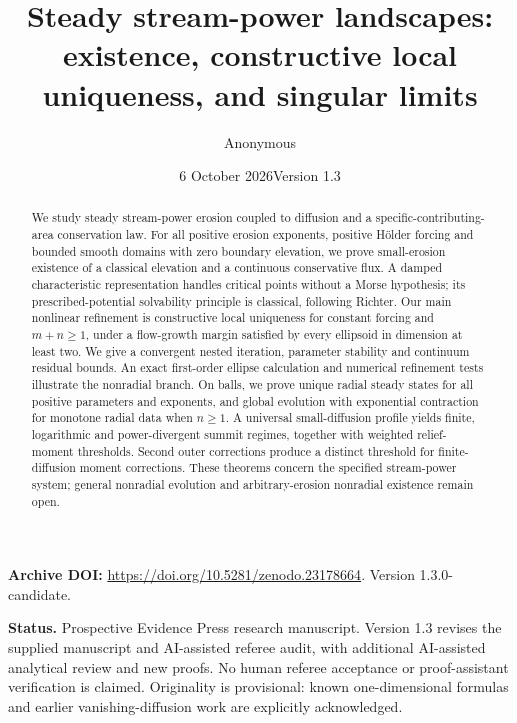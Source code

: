 \documentclass[11pt,a4paper]{article}
\title{Steady stream-power landscapes:\\existence, constructive local uniqueness, and singular limits}
\author{Anonymous}
\date{6 October 2026\quad\textnormal{Version 1.3}}
\theoremstyle{definition}\newtheorem{definition}[theorem]{Definition}
\theoremstyle{remark}\newtheorem{remark}[theorem]{Remark}
\begin{document}
\maketitle
\noindent\textbf{Archive DOI:} \url{https://doi.org/10.5281/zenodo.23178664}. Version 1.3.0-candidate.

\begin{abstract}
We study steady stream-power erosion coupled to diffusion and a specific-contributing-area conservation law. For all positive erosion exponents, positive H\"older forcing and bounded smooth domains with zero boundary elevation, we prove small-erosion existence of a classical elevation and a continuous conservative flux. A damped characteristic representation handles critical points without a Morse hypothesis; its prescribed-potential solvability principle is classical, following Richter. Our main nonlinear refinement is constructive local uniqueness for constant forcing and $m+n\geq1$, under a flow-growth margin satisfied by every ellipsoid in dimension at least two. We give a convergent nested iteration, parameter stability and continuum residual bounds. An exact first-order ellipse calculation and numerical refinement tests illustrate the nonradial branch. On balls, we prove unique radial steady states for all positive parameters and exponents, and global evolution with exponential contraction for monotone radial data when $n\geq1$. A universal small-diffusion profile yields finite, logarithmic and power-divergent summit regimes, together with weighted relief-moment thresholds. Second outer corrections produce a distinct threshold for finite-diffusion moment corrections. These theorems concern the specified stream-power system; general nonradial evolution and arbitrary-erosion nonradial existence remain open.
\end{abstract}
\noindent\textbf{Status.} Prospective Evidence Press research manuscript. Version 1.3 revises the supplied manuscript and AI-assisted referee audit, with additional AI-assisted analytical review and new proofs. No human referee acceptance or proof-assistant verification is claimed. Originality is provisional: known one-dimensional formulas and earlier vanishing-diffusion work are explicitly acknowledged.
\end{document}
